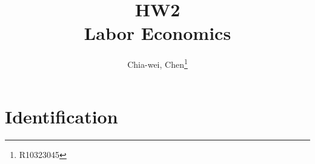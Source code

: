 \documentclass[12pt]{article}
\author{Chia-wei, Chen\thanks{R10323045}}
\title{HW2 \\ Labor Economics}
\begin{document}
    \maketitle

    \section{Identification}
    
    
    

  
\end{document}
